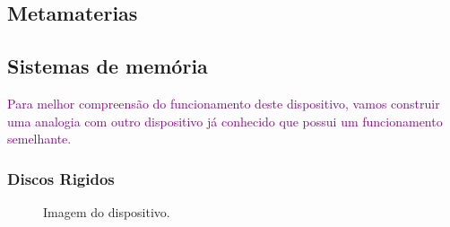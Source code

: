 \subsection{Metamaterias}

\subsection{Sistemas de memória}
    \textcolor{purple}{Para melhor compreensão do funcionamento deste dispositivo, vamos construir uma analogia com outro dispositivo já conhecido que possui um funcionamento semelhante.}

\subsubsection{Discos Rigidos}

    \begin{figure}[H]
        \centering
        \caption{Imagem do dispositivo\cite{chen2021reprogrammable}.}
        \label{fig:device}
    \end{figure}